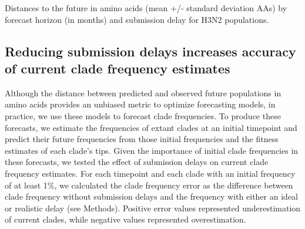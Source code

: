 \documentclass[9pt,lineno]{elife}
\begin{document}
\begin{table}[htb]
  \begin{center}
    
    \caption{Distances to the future in amino acids (mean +/- standard deviation AAs) by forecast horizon (in months) and submission delay for H3N2 populations.}
    \label{tab:h3n2_distances_to_the_future}
  \end{center}
\end{table}

\subsection{Reducing submission delays increases accuracy of current clade frequency estimates}

Although the distance between predicted and observed future populations in amino acids provides an unbiased metric to optimize forecasting models, in practice, we use these models to forecast clade frequencies.
To produce these forecasts, we estimate the frequencies of extant clades at an initial timepoint and predict their future frequencies from those initial frequencies and the fitness estimates of each clade's tips.
Given the importance of initial clade frequencies in these forecasts, we tested the effect of submission delays on current clade frequency estimates.
For each timepoint and each clade with an initial frequency of at least 1\%, we calculated the clade frequency error as the difference between clade frequency without submission delays and the frequency with either an ideal or realistic delay (see Methods).
Positive error values represented underestimation of current clades, while negative values represented overestimation.
\end{document}
